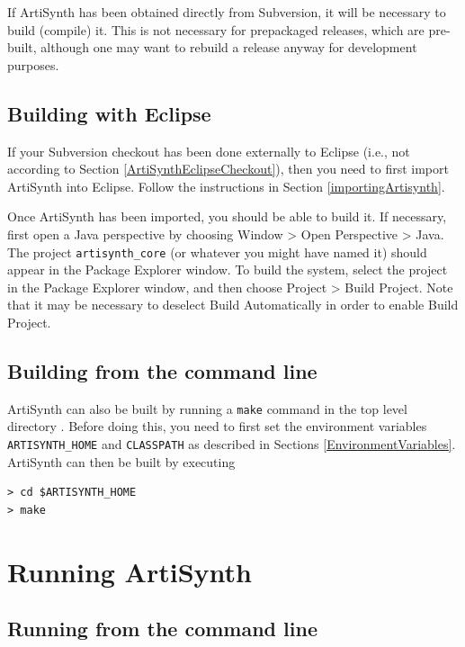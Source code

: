 \documentclass{article}
\def\directory{directory }
\begin{document}
If ArtiSynth has been obtained directly from Subversion, it will be
necessary to build (compile) it. This is not necessary for prepackaged
releases, which are pre-built, although one may want to rebuild a
release anyway for development purposes.

\subsection{Building with Eclipse}
\label{BuildingWithEclipse}

If your Subversion checkout has been done externally to Eclipse (i.e.,
not according to Section \ref{ArtiSynthEclipseCheckout}), then you
need to first import ArtiSynth into Eclipse. Follow the instructions
in Section \ref{importingArtisynth}.

Once ArtiSynth has been imported, you should be able to build it.  If
necessary, first open a Java perspective by choosing {\sf Window >
Open Perspective > Java}. The project {\tt artisynth\_core} (or
whatever you might have named it) should appear in the {\sf Package
Explorer} window. To build the system, select the project in the {\sf
Package Explorer} window, and then choose {\sf Project > Build
Project}. Note that it may be necessary to deselect {\sf Build
Automatically} in order to enable {\sf Build Project}.

\subsection{Building from the command line}
\label{BuildingWithCygwin}

ArtiSynth can also be built by running a {\tt make} command in the top
level \directory. Before doing this, you need to first set the environment
variables {\tt ARTISYNTH\_HOME} and {\tt CLASSPATH} as described in
Sections \ref{EnvironmentVariables}. ArtiSynth can then be built by
executing

\begin{verbatim}
> cd $ARTISYNTH_HOME
> make
\end{verbatim}

\section{Running ArtiSynth}
\label{Running}

\subsection{Running from the command line}
\label{artisynthCommandLine}
\end{document}
